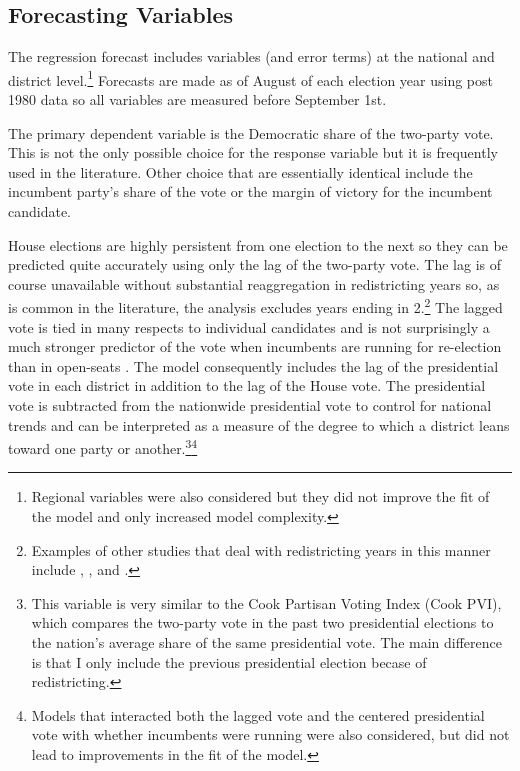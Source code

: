 \documentclass[12pt,final,fleqn]{article}
\theoremstyle{plain}
\begin{document}
\subsection{Forecasting Variables}
The regression forecast includes variables (and error terms) at the national and district level.\footnote{Regional variables were also considered but they did not improve the fit of the model and only increased model complexity.} Forecasts are made as of August of each election year using post 1980 data so all variables are measured before September 1st.

The primary dependent variable is the Democratic share of the two-party vote. This is not the only possible choice for the response variable but it is frequently used in the literature. Other choice that are essentially identical include the incumbent party's share of the vote or the margin of victory for the incumbent candidate.

House elections are highly persistent from one election to the next so they can be predicted quite accurately using only the lag of the two-party vote. The lag is of course unavailable without substantial reaggregation in redistricting years so, as is common in the literature, the analysis excludes years ending in 2.\footnote{Examples of other studies that deal with redistricting years in this manner include \citet{gelman1990estimating}, \citet{kastellec2008predicting}, and \citet{gelman2008estimating}.} The lagged vote is tied in many respects to individual candidates and is not surprisingly a much stronger predictor of the vote when incumbents are running for re-election than in open-seats \citep{gelman2008estimating}. The model consequently includes the lag of the presidential vote in each district in addition to the lag of the House vote. The presidential vote is subtracted from the nationwide presidential vote to control for national trends and can be interpreted as a measure of the degree to which a district leans toward one party or another.\footnote{This variable is very similar to the Cook Partisan Voting Index (Cook PVI), which compares the two-party vote in the past two presidential elections to the nation's average share of the same presidential vote. The main difference is that I only include the previous presidential election becase of redistricting.}\footnote{Models that interacted both the lagged vote and the centered presidential vote with whether incumbents were running were also considered, but did not lead to improvements in the fit of the model.}
\end{document}
